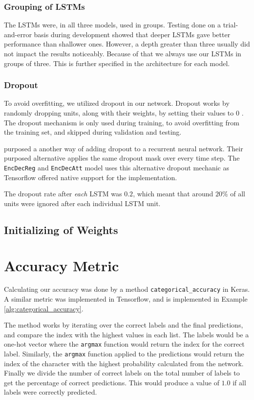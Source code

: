 \subsubsection{Grouping of LSTMs}
The LSTMs were, in all three models, used in groups. Testing done on a trial-and-error basis during development showed that deeper LSTMs gave better performance than shallower ones. However, a depth greater than three usually did not impact the results noticeably. Because of that we always use our LSTMs in groups of three. This is further specified in the architecture for each model.

\subsubsection{Dropout}
To avoid overfitting, we utilized dropout in our network. Dropout works by randomly dropping units, along with their weights, by setting their values to \(0\) \citep{srivastava2014dropout}. The dropout mechanism is only used during training, to avoid overfitting from the training set, and skipped during validation and testing.

\citep{gal2016theoretically} purposed a another way of adding dropout to a recurrent neural network. Their purposed alternative applies the same dropout mask over every time step. The {\tt EncDecReg} and {\tt EncDecAtt} model uses this alternative dropout mechanic as Tensorflow offered native support for the implementation.

The dropout rate after \emph{each} LSTM was \(0.2\), which meant that around \(20\%\) of all units were ignored after each individual LSTM unit.

\subsection{Initializing of Weights}


\section{Accuracy Metric}
Calculating our accuracy was done by a method {\tt categorical\_accuracy} in Keras. A similar metric was implemented in Tensorflow, and is implemented in Example \ref{alg:categorical_accuracy}.

The method works by iterating over the correct labels and the final predictions, and compare the index with the highest values in each list. The labels would be a one-hot vector where the {\tt argmax} function would return the index for the correct label. Similarly, the {\tt argmax} function applied to the predictions would return the index of the character with the highest probability calculated from the network. Finally we divide the number of correct labels on the total number of labels to get the percentage of correct predictions. This would produce a value of \(1.0\) if all labels were correctly predicted.


